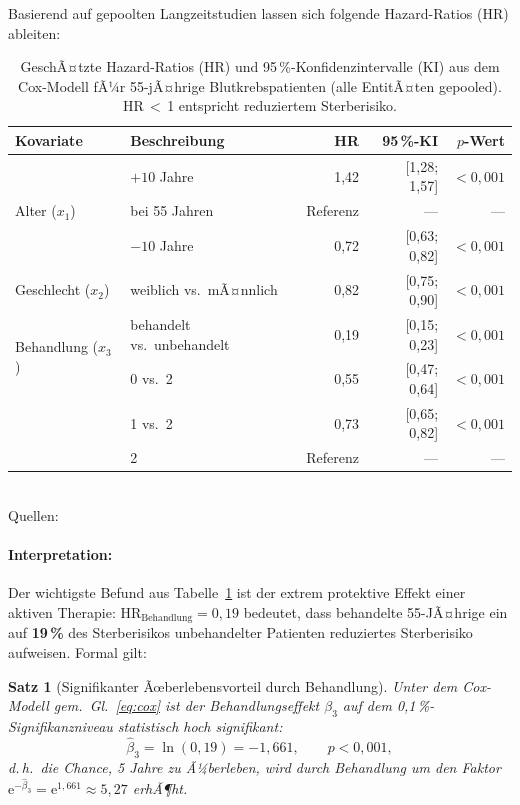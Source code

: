 ﻿\documentclass[12pt,a4paper]{article}
\newtheorem{theorem}{Satz}[section]
\theoremstyle{definition}
\begin{document}
Basierend auf gepoolten Langzeitstudien \cite{dohner2017,hochhaus2017,coiffier2002}
lassen sich folgende Hazard-Ratios (HR) ableiten:

\begin{table}[ht]
\centering
\caption{GeschÃ¤tzte Hazard-Ratios (HR) und 95\,\%-Konfidenzintervalle (KI) aus dem
Cox-Modell fÃ¼r 55-jÃ¤hrige Blutkrebspatienten (alle EntitÃ¤ten gepooled).
HR\,$<$\,1 entspricht reduziertem Sterberisiko.}
\label{tab:cox}
\begin{tabular}{@{}llrrr@{}}
\toprule
Kovariate & Beschreibung & HR & 95\,\%-KI & $p$-Wert \\
\midrule
\multirow{3}{*}{Alter ($x_1$)} & $+10$ Jahre & 1{,}42 & [1{,}28; 1{,}57] & $<0{,}001$ \\
& bei 55 Jahren & Referenz & --- & --- \\
& $-10$ Jahre & 0{,}72 & [0{,}63; 0{,}82] & $<0{,}001$ \\
\midrule
Geschlecht ($x_2$) & weiblich vs.\ mÃ¤nnlich & 0{,}82 & [0{,}75; 0{,}90] & $<0{,}001$ \\
\midrule
\multirow{2}{*}{Behandlung ($x_3$)} & behandelt vs.\ unbehandelt & 0{,}19 & [0{,}15; 0{,}23] & $<0{,}001$ \\
\midrule
\multirow{3}{*}{ECOG ($x_4$)} & 0 vs.\ 2 & 0{,}55 & [0{,}47; 0{,}64] & $<0{,}001$ \\
& 1 vs.\ 2 & 0{,}73 & [0{,}65; 0{,}82] & $<0{,}001$ \\
& 2 & Referenz & --- & --- \\
\bottomrule
\end{tabular}
\smallskip\\
\footnotesize Quellen: \cite{dohner2017,hochhaus2017,coiffier2002,appelbaum2006,extermann2007}
\end{table}

\paragraph{Interpretation:} Der wichtigste Befund aus Tabelle~\ref{tab:cox} ist der
extrem protektive Effekt einer aktiven Therapie:
$\mathrm{HR}_{\text{Behandlung}} = 0{,}19$ bedeutet, dass behandelte 55-JÃ¤hrige
ein auf \textbf{19\,\%} des Sterberisikos unbehandelter Patienten reduziertes
Sterberisiko aufweisen. Formal gilt:

\begin{theorem}[Signifikanter Ãœberlebensvorteil durch Behandlung]
  \label{thm:treatment_benefit}
  Unter dem Cox-Modell gem.\ Gl.~\eqref{eq:cox} ist der Behandlungseffekt
  $\beta_3$ auf dem 0{,}1\,\%-Signifikanzniveau statistisch hoch signifikant:
  \begin{equation}
    \hat{\beta}_3 = \ln(0{,}19) = -1{,}661,
    \qquad
    p < 0{,}001,
    \label{eq:beta_treatment}
  \end{equation}
  d.\,h.\ die Chance, 5 Jahre zu Ã¼berleben, wird durch Behandlung um den Faktor
  $\mathrm{e}^{-\hat{\beta}_3} = \mathrm{e}^{1{,}661} \approx 5{,}27$ erhÃ¶ht.
\end{theorem}
\end{document}
